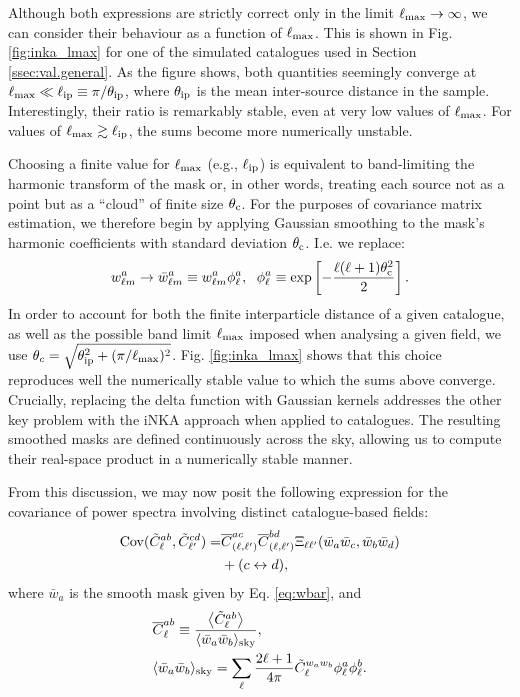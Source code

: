 \documentclass[%
 reprint,
superscriptaddress,
nofootinbib,
 amsmath,amssymb,
 aps,
 prd,
]{revtex4-2}
\begin{document}
    Although both expressions are strictly correct only in the limit $\ell_{\rm max}\rightarrow\infty$, we can consider their behaviour as a function of $\ell_{\rm max}$. This is shown in Fig. \ref{fig:inka_lmax} for one of the simulated catalogues used in Section \ref{ssec:val.general}. As the figure shows, both quantities seemingly converge at $\ell_{\rm max}\ll\ell_{\rm ip}\equiv\pi/\theta_{\rm ip}$, where $\theta_{\rm ip}$ is the mean inter-source distance in the sample. Interestingly, their ratio is remarkably stable, even at very low values of $\ell_{\rm max}$. For values of $\ell_{\rm max}\gtrsim\ell_{\rm ip}$, the sums become more numerically unstable.

    Choosing a finite value for $\ell_{\rm max}$ (e.g., $\ell_{\rm ip}$) is equivalent to band-limiting the harmonic transform of the mask or, in other words, treating each source not as a point but as a ``cloud'' of finite size $\theta_{\rm c}$. For the purposes of covariance matrix estimation, we therefore begin by applying Gaussian smoothing to the mask's harmonic coefficients with standard deviation $\theta_{\rm c}$. I.e. we replace:
    \begin{align}\label{eq:wbar}
      w^a_{\ell m}\rightarrow \bar{w}^a_{\ell m}\equiv w^a_{\ell m}\phi^a_\ell,\hspace{6pt}
      \phi^a_\ell\equiv\exp\left[-\frac{\ell(\ell+1)\theta_{\rm c}^2}{2}\right].
    \end{align}
    In order to account for both the finite interparticle distance of a given catalogue, as well as the possible band limit $\ell_{\rm max}$ imposed when analysing a given field, we use $\theta_c=\sqrt{\theta_{\rm ip}^2+(\pi/\ell_{\rm max})^2}$. Fig. \ref{fig:inka_lmax} shows that this choice reproduces well the numerically stable value to which the sums above converge. Crucially, replacing the delta function with Gaussian kernels addresses the other key problem with the iNKA approach when applied to catalogues. The resulting smoothed masks are defined continuously across the sky, allowing us to compute their real-space product in a numerically stable manner.

    From this discussion, we may now posit the following expression for the covariance of power spectra involving distinct catalogue-based fields:
    \begin{align}\nonumber
      {\rm Cov}(\tilde{C}^{ab}_\ell,\tilde{C}^{cd}_{\ell'})=
      &\overline{C}^{ac}_{(\ell,\ell')}\overline{C}^{bd}_{(\ell,\ell')}\Xi_{\ell\ell'}(\bar{w}_a\bar{w}_c,\bar{w}_b\bar{w}_d)\\\label{eq:nka_catdiff}
      &+(c\leftrightarrow d),
    \end{align}
    where $\bar{w}_a$ is the smooth mask given by Eq. \ref{eq:wbar}, and
    \begin{align}\nonumber
      &\overline{C}^{ab}_\ell\equiv\frac{\left\langle\tilde{C}^{ab}_\ell\right\rangle}{\langle \bar{w}_a\bar{w}_b\rangle_{\rm sky}},\\
      &\langle\bar{w}_a\bar{w}_b\rangle_{\rm sky}=\sum_{\ell}\frac{2\ell+1}{4\pi}\tilde{C}^{w_aw_b}_\ell\phi^a_\ell\phi^b_\ell. \label{eq:inka_cell}
    \end{align}
\end{document}
